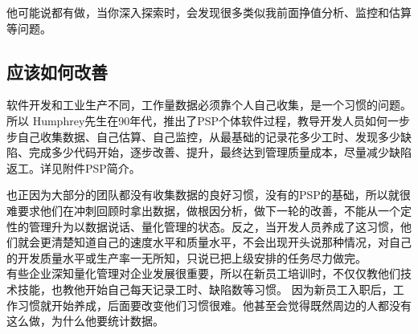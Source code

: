他可能说都有做，当你深入探索时，会发现很多类似我前面挣值分析、监控和估算等问题。

\hypertarget{ux5e94ux8be5ux5982ux4f55ux6539ux5584}{%
\subsection{应该如何改善}\label{ux5e94ux8be5ux5982ux4f55ux6539ux5584}}

软件开发和工业生产不同，工作量数据必须靠个人自己收集，是一个习惯的问题。所以
Humphrey先生在90年代，推出了PSP个体软件过程，教导开发人员如何一步步自己收集数据、自己估算、自己监控，从最基础的记录花多少工时、发现多少缺陷、完成多少代码开始，逐步改善、提升，最终达到管理质量成本，尽量减少缺陷返工。详见附件PSP简介。

也正因为大部分的团队都没有收集数据的良好习惯，没有的PSP的基础，所以就很难要求他们在冲刺回顾时拿出数据，做根因分析，做下一轮的改善，不能从一个定性的管理升为以数据说话、量化管理的状态。反之，当开发人员养成了这习惯，他们就会更清楚知道自己的速度水平和质量水平，不会出现开头说那种情况，对自己的开发质量水平或生产率一无所知，只说已把上级安排的任务尽力做完。\\
有些企业深知量化管理对企业发展很重要，所以在新员工培训时，不仅仅教他们技术技能，也教他开始自己每天记录工时、缺陷数等习惯。
因为新员工入职后，工作习惯就开始养成，后面要改变他们习惯很难。他甚至会觉得既然周边的人都没有这么做，为什么他要统计数据。

